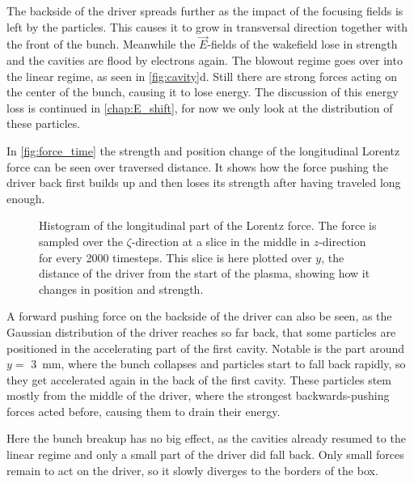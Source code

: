 \documentclass[bachelor_thesis]{subfiles}
\begin{document}
The backside of the driver spreads further as the impact of the focusing fields is left by the particles. This causes it to grow in transversal direction together with the front of the bunch. 
Meanwhile the $\vec{E}$-fields of the wakefield lose in strength and the cavities are flood by electrons again. The blowout regime goes over into the linear regime, as seen in \autoref{fig:cavity}d.
Still there are strong forces acting on the center of the bunch, causing it to lose energy. The discussion of this energy loss is continued in \autoref{chap:E_shift}, for now we only look at the distribution of these particles.

In \autoref{fig:force_time} the strength and position change of the longitudinal Lorentz force can be seen over traversed distance. It shows how the force pushing the driver back first builds up and then loses its strength after having traveled long enough.
\begin{figure}
	\centering
	
	\caption{Histogram of the longitudinal part of the Lorentz force. The force is sampled over the $\zeta$-direction at a slice in the middle in $z$-direction for every 2000 timesteps. This slice is here plotted over $y$, the distance of the driver from the start of the plasma, showing how it changes in position and strength.}
	\label{fig:force_time}
\end{figure}
A forward pushing force on the backside of the driver can also be seen, as the Gaussian distribution of the driver reaches so far back, that some particles are positioned in the accelerating part of the first cavity.
Notable is the part around $y=$ \qty{3}{mm}, where the bunch collapses and particles start to fall back rapidly, so they get accelerated again in the back of the first cavity. These particles stem mostly from the middle of the driver,
where the strongest backwards-pushing forces acted before, causing them to drain their energy. 

Here the bunch breakup has no big effect, as the cavities already resumed to the linear regime and only a small part of the driver did fall back. Only small forces remain to act on the driver, so it slowly diverges to the borders of the box.
\end{document}
